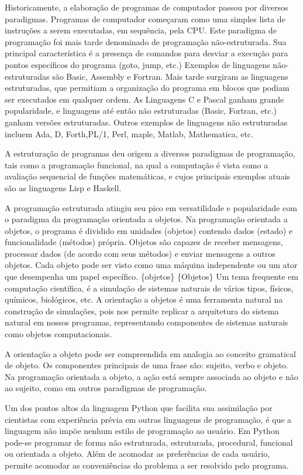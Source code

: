 \documentclass[a4paper,10pt,portuguese]{sphinxmanual}
\begin{document}
Historicamente, a elaboração de programas de computador passou por diversos paradigmas. Programas de computador começaram como uma simples lista de instruções a serem executadas, em sequência, pela CPU. Este paradigma de programação foi mais tarde denominado de programação não-estruturada. Sua principal característica é a presença de comandos para desviar a execução para pontos específicos do programa (goto, jump, etc.) Exemplos de linguagens não-estruturadas são Basic, Assembly e Fortran. Mais tarde surgiram as linguagens estruturadas, que permitiam a organização do programa em blocos que podiam ser executados em qualquer ordem. As Linguagens C e Pascal ganham grande popularidade, e linguagens até então não estruturadas (Basic, Fortran, etc.) ganham versões estruturadas. Outros exemplos de linguagens não estruturadas incluem Ada, D, Forth,PL/1, Perl, maple, Matlab, Mathematica, etc.

A estruturação de programas deu origem a diversos paradigmas de programação, tais como a programação funcional, na qual a computação é vista como a avaliação sequencial de funções matemáticas, e cujos principais exemplos atuais são as linguagens Lisp e Haskell.

A programação estruturada atingiu seu pico em versatilidade e popularidade com o paradigma da programação orientada a objetos. Na programação orientada a objetos, o programa é dividido em unidades (objetos) contendo dados (estado) e funcionalidade (métodos) própria. Objetos são capazes de receber mensagens, processar dados (de acordo com seus métodos) e enviar mensagens a outros objetos. Cada objeto pode ser visto como uma máquina independente ou um ator que desempenha um papel específico. \{objetos\} \{Objetos\} Um tema frequente em computação científica, é a simulação de sistemas naturais de vários tipos, físicos, químicos, biológicos, etc. A orientação a objetos é uma ferramenta natural na construção de simulações, pois nos permite replicar a arquitetura do sistema natural em nossos programas, representando componentes de sistemas naturais como objetos computacionais.

A orientação a objeto pode ser compreendida em analogia ao conceito
gramatical de objeto. Os componentes principais de uma frase são:
sujeito, verbo e objeto. Na programação orientada a objeto, a ação
está sempre associada ao objeto e não ao sujeito, como em outros
paradigmas de programação.

Um dos pontos altos da linguagem Python que facilita sua
assimilação por cientistas com experiência prévia em outras
linguagens de programação, é que a linguagem não impõe nenhum
estilo de programação ao usuário. Em Python pode-se programar de
forma não estruturada, estruturada, procedural, funcional ou
orientada a objeto. Além de acomodar as preferências de cada
usuário, permite acomodar as conveniências do problema a ser
resolvido pelo programa.
\end{document}
